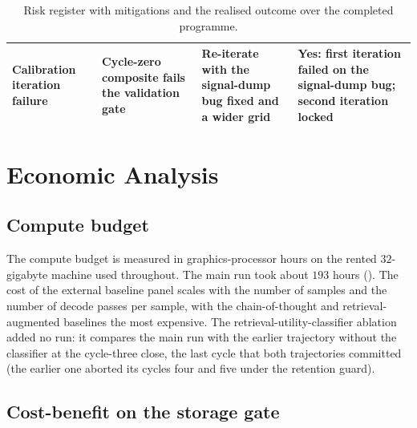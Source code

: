 \begin{table}[!htbp]
\begin{tabular}{@{}>{\raggedright\arraybackslash}p{2.6cm}>{\raggedright\arraybackslash}p{3.6cm}>{\raggedright\arraybackslash}p{4.1cm}>{\raggedright\arraybackslash}p{3.6cm}@{}}
Calibration iteration failure & Cycle-zero composite fails the validation gate & Re-iterate with the signal-dump bug fixed and a wider grid & \textbf{Yes}: first iteration failed on the signal-dump bug; second iteration locked \\
\bottomrule
\end{tabular}
\caption[Risk register with mitigations and the realised outcome.]{Risk register with mitigations and the realised outcome over the completed programme.}
\label{tab:risk-register}
\end{table}

\section{Economic Analysis}
\label{sec:economic}

\subsection{Compute budget}
\label{sec:econ-budget}

The compute budget is measured in graphics-processor hours on the rented $32$-gigabyte machine used throughout. The main run took about $193$ hours (). The cost of the external baseline panel scales with the number of samples and the number of decode passes per sample, with the chain-of-thought and retrieval-augmented baselines the most expensive. The retrieval-utility-classifier ablation added no run: it compares the main run with the earlier trajectory without the classifier at the cycle-three close, the last cycle that both trajectories committed (the earlier one aborted its cycles four and five under the retention guard).

\subsection{Cost-benefit on the storage gate}
\label{sec:econ-cost-benefit}

